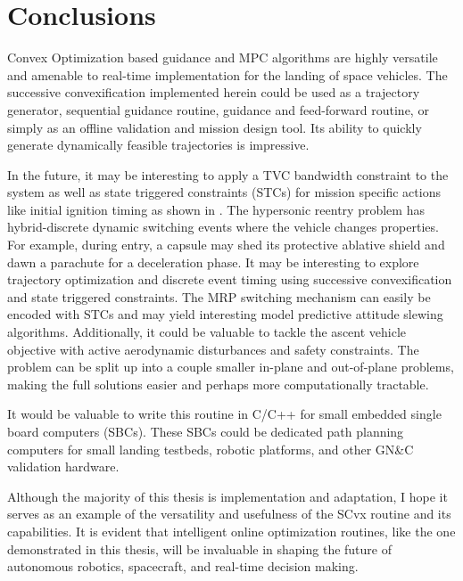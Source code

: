 \chapter{Conclusions}
\label{conclusions}


Convex Optimization based guidance and MPC algorithms are highly versatile and amenable to real-time implementation for the landing of space vehicles. The successive convexification implemented herein could be used as a trajectory generator, sequential guidance routine, guidance and feed-forward routine, or simply as an offline validation and mission design tool. Its ability to quickly generate dynamically feasible trajectories is impressive.

In the future, it may be interesting to apply a TVC bandwidth constraint to the system as well as state triggered constraints (STCs) for mission specific actions like initial ignition timing as shown in \cite{szmuk2018successivestcs}. The hypersonic reentry problem has hybrid-discrete dynamic switching events where the vehicle changes properties. For example, during entry, a capsule may shed its protective ablative shield and dawn a parachute for a deceleration phase. It may be interesting to explore trajectory optimization and discrete event timing using successive convexification and state triggered constraints. The MRP switching mechanism can easily be encoded with STCs and may yield interesting model predictive attitude slewing algorithms. Additionally, it could be valuable to tackle the ascent vehicle objective with active aerodynamic disturbances and safety constraints. The problem can be split up into a couple smaller in-plane and out-of-plane problems, making the full solutions easier and perhaps more computationally tractable.

It would be valuable to write this routine in C/C++ for small embedded single board computers (SBCs). These SBCs could be dedicated path planning computers for small landing testbeds, robotic platforms, and other GN\&C validation hardware.


Although the majority of this thesis is implementation and adaptation, I hope it serves as an example of the versatility and usefulness of the SCvx routine and its capabilities. It is evident that intelligent online optimization routines, like the one demonstrated in this thesis, will be invaluable in shaping the future of autonomous robotics, spacecraft, and real-time decision making.